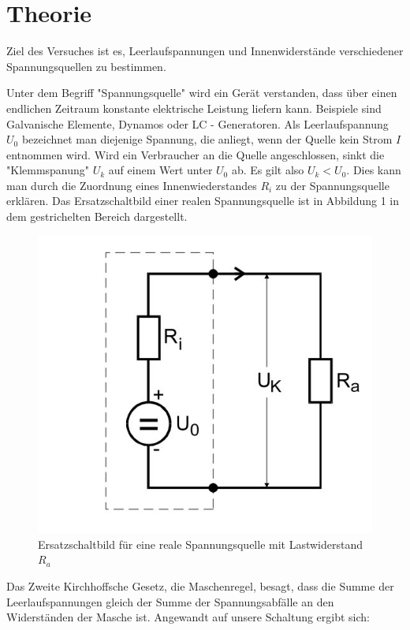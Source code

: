 \section{Theorie}
\label{sec:Theorie}
Ziel des Versuches ist es, Leerlaufspannungen und Innenwiderstände verschiedener 
Spannungsquellen zu bestimmen.

Unter dem Begriff "Spannungsquelle" wird ein Gerät verstanden, dass über
einen endlichen Zeitraum konstante elektrische Leistung liefern kann. 
Beispiele sind Galvanische Elemente, Dynamos oder LC - Generatoren. 
Als Leerlaufspannung $U_0$ bezeichnet man diejenige Spannung, die anliegt,
wenn der Quelle kein Strom $I$ entnommen wird. 
Wird ein Verbraucher an die Quelle angeschlossen, sinkt die "Klemmspanung"
$U_k$ auf einem Wert unter $U_0$ ab. Es gilt also $U_k < U_0$. Dies kann man 
durch die Zuordnung eines Innenwiederstandes $R_i$ zu der Spannungsquelle 
erklären. 
Das Ersatzschaltbild einer realen Spannungsquelle ist in Abbildung 
1 in dem gestrichelten Bereich dargestellt. 

\begin{figure}
\center
\includegraphics[scale=0.3]{Ersatzschaltbild.jpg}
\caption{Ersatzschaltbild für eine reale Spannungsquelle mit Lastwiderstand $R_a$}
\label{fig:Ersatz}
\end{figure}

Das Zweite Kirchhoffsche Gesetz, die Maschenregel, besagt, dass die Summe der 
Leerlaufspannungen gleich der Summe der Spannungsabfälle an den Widerständen der 
Masche ist. Angewandt auf unsere Schaltung ergibt sich:

